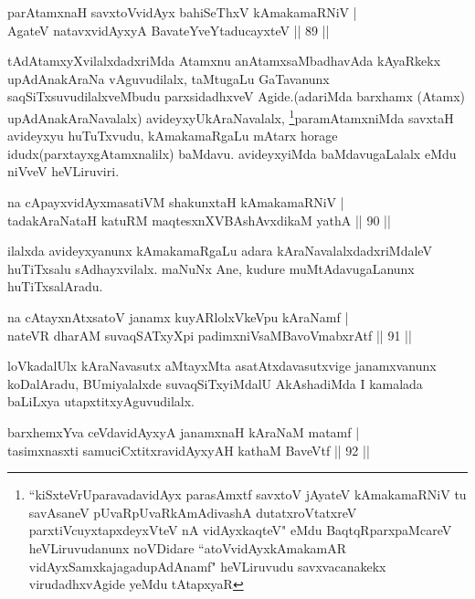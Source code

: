 \begin{shl}
parAtamxnaH savxtoV\s vidAyx bahiSeThxV kAmakamaRNiV |\\
AgateV natavxvidAyxyA BavateYveYtaducayxteV \hfill || 89 ||
\end{shl}

\begin{artha}
tAdAtamxyXvilalxdadxriMda Atamxnu anAtamxsaMbadhavAda kAyaRkekx upAdAnakAraNa vAguvudilalx, taMtugaLu GaTavanunx saqSiTxsuvudilalxveMbudu parxsidadhxveV Agide.(adariMda barxhamx (Atamx) upAdAnakAraNavalalx) avideyxyUkAraNavalalx, \footnote{``kiSxteVrUparavadavidAyx parasAmxtf savxtoV jAyateV kAmakamaRNiV tu savAsaneV pUvaRpUvaRkAmAdivashA dutatxroVtatxreV parxtiVcuyxtapxdeyxVteV nA vidAyxkaqteV" eMdu BaqtqRparxpaMcareV heVLiruvudanunx noVDidare ``atoVvidAyxkAmakamAR vidAyxSamxkajagadupAdAnamf" heVLiruvudu savxvacanakekx virudadhxvAgide yeMdu tAtapxyaR}paramAtamxniMda savxtaH avideyxyu huTuTxvudu, kAmakamaRgaLu mAtarx horage idudx(parxtayxgAtamxnalilx) baMdavu. avideyxyiMda baMdavugaLalalx eMdu niVveV heVLiruviri.
\end{artha}


\begin{shl}
na cApayxvidAyxmasatiVM shakunxtaH kAmakamaRNiV |\\
tadakAraNataH katuRM maqtesxnXVBAshAvxdikaM yathA \hfill || 90 ||
\end{shl}

\begin{artha}
ilalxda avideyxyanunx kAmakamaRgaLu adara kAraNavalalxdadxriMdaleV huTiTxsalu 
sAdhayxvilalx. maNuNx Ane, kudure muMtAdavugaLanunx huTiTxsalAradu.
\end{artha}

\begin{shl}
na cAtayxnAtxsatoV janamx kuyARlolxVkeV\s pu kAraNamf |\\
nateVR dharAM suvaqSATxyX\s pi padimxniVsaMBavoV\s mabxrAtf \hfill || 91 ||
\end{shl}

\begin{artha}
loVkadalUlx kAraNavasutx aMtayxMta asatAtxdavasutxvige janamxvanunx koDalAradu, BUmiyalalxde suvaqSiTxyiMdalU AkAshadiMda I kamalada baLiLxya utapxtitxyAguvudilalx.
\end{artha}

\begin{shl}
barxhemxYva ceVdavidAyxyA janamxnaH kAraNaM matamf |\\
tasimxnasxti samuciCxtitxravidAyxyAH kathaM BaveVtf \hfill || 92 ||
\end{shl}

